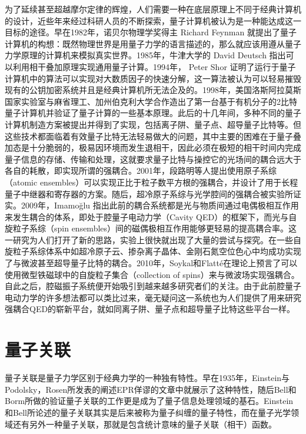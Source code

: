 为了延续甚至超越摩尔定律的辉煌，人们需要一种在底层原理上不同于经典计算机的设计，近些年来经过科研人员的不断探索，量子计算机被认为是一种能达成这一目标的途径。早在1982年，诺贝尔物理学奖得主 Richard Feynman 就提出了量子计算机的构想：既然物理世界是用量子力学的语言描述的，那么就应该用遵从量子力学原理的计算机来模拟真实世界\cite{feynman1982quantum}。1985年，牛津大学的 David Deutsch 指出可以利用相干叠加原理实现通用量子计算。1994年， Peter Shor 证明了运行于量子计算机中的算法可以实现对大数质因子的快速分解，这一算法被认为可以轻易摧毁现有的公钥加密系统并且是经典计算机所无法企及的。1998年，美国洛斯阿拉莫斯国家实验室与麻省理工、加州伯克利大学合作造出了第一台基于有机分子的2比特量子计算机并验证了量子计算的一些基本原理\ChangeNotation\cite{PhysRevLett.80.3408}。此后的十几年间，多种不同的量子计算机制造方案被提出并得到了实现，包括离子阱、量子点、超导量子比特等。但这些技术都面临着有效量子比特无法轻易做大的问题，其中主要的困难在于量子叠加态是十分脆弱的，极易因环境而发生退相干，因此必须在极短的相干时间内完成量子信息的存储、传输和处理，这就要求量子比特与操控它的光场间的耦合远大于各自的耗散，即实现所谓的强耦合\ChangeNotation\cite{PhysRevApplied.2.054002Tobar}。2001年，段路明等人提出使用原子系综（atomic ensembles）可以实现正比于粒子数平方根的强耦合\ChangeNotation，并设计了用于长程量子中继器和寄存器的方案\ChangeNotation\cite{Duan2001}。随后，超冷原子系综与光学腔间的强耦合被实验所证实。2009年，Imamo\u{g}lu 指出此前的耦合系统都是光与物质间通过电偶极相互作用来发生耦合的体系，即处于腔量子电动力学（Cavity QED）的框架下，而光与自旋粒子系综（spin ensembles）间的磁偶极相互作用能够更轻易的提高耦合率\ChangeNotation\cite{PhysRevLett.102.083602Imamoifmmode}。这一研究为人们打开了新的思路，实验上很快就出现了大量的尝试与探究。在一些自旋粒子系综体系中如超冷原子云、掺杂离子晶体、金刚石氮空位色心中均成功实现了与微波甚至超导量子比特的耦合\ChangeNotation\cite{PhysRevLett.103.043603,PhysRevLett.105.140501,PhysRevLett.105.140502}。2010年，Soykal和Flatt\'e在理论上预言了可以使用微型铁磁球中的自旋粒子集合（collection of spins）来与微波场实现强耦合\ChangeNotation\cite{PhysRevLett.104.077202Soykal}。自此之后，腔磁振子系统便开始吸引到越来越多研究者们的关注。由于此前腔量子电动力学的许多想法都可以类比过来，毫无疑问这一系统也为人们提供了用来研究强耦合QED的崭新平台，就如同离子阱、量子点和超导量子比特这些平台一样。

\section{量子关联}
量子关联是量子力学区别于经典力学的一种独有特性。早在1935年，Einstein与Podolsky，Rosen所发表的阐述EPR佯谬的文章中就展示了这种特性，随后Bell和Borm所做的验证量子关联的工作更是成为了量子信息处理领域的基石。Einstein和Bell所论述的量子关联其实是后来被称为量子纠缠的量子特性，而在量子光学领域还有另外一种量子关联，那就是包含统计意味的量子关联（相干）函数\ChangeNotation\cite{gerry2005introductory}。

